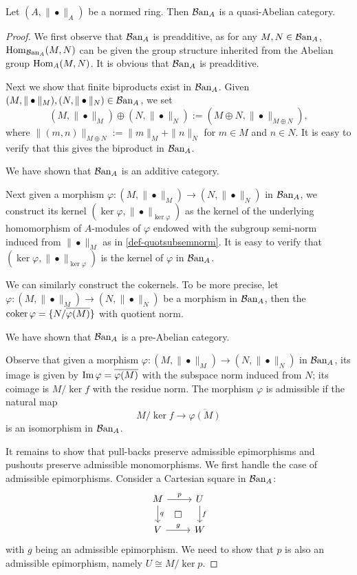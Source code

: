 \begin{thm}
    Let $(A,\|\bullet\|_A)$ be a normed ring. Then $\mathcal{B}\mathrm{an}_A$ is a quasi-Abelian category.
\end{thm}
\begin{proof}
    We first observe that $\mathcal{B}\mathrm{an}_A$ is preadditive, as for any $M,N\in \mathcal{B}\mathrm{an}_A$, $\operatorname{Hom}_{\mathcal{B}\mathrm{an}_A}(M,N)$ can be given the group structure inherited from the Abelian group $\operatorname{Hom}_A(M,N)$. It is obvious that $\mathcal{B}\mathrm{an}_A$ is preadditive.

    Next we show that finite biproducts exist in $\mathcal{B}\mathrm{an}_A$. Given $(M,\|\bullet\|_{M}),(N,\|\bullet\|_{N})\in \mathcal{B}\mathrm{an}_A$, we set 
    \begin{equation}\label{eq-normedmodulesum}
        (M,\|\bullet\|_{M})\oplus  (N,\|\bullet\|_{N}):=(M\oplus N,\|\bullet\|_{M\oplus N}),
    \end{equation}
    where $\|(m,n)\|_{M\oplus N}:=\|m\|_M+\|n\|_N$ for $m\in M$ and $n\in N$. It is easy to verify that this gives the biproduct in $\mathcal{B}\mathrm{an}_A$. 

    We have shown that $\mathcal{B}\mathrm{an}_A$ is an additive category.

    Next given a morphism $\varphi:(M,\|\bullet\|_M)\rightarrow (N,\|\bullet\|_N)$ in $\mathcal{B}\mathrm{an}_A$, we construct its kernel $(\ker \varphi, \|\bullet\|_{\ker\varphi})$ as the kernel of the underlying homomorphism of $A$-modules of $\varphi$ endowed with the subgroup semi-norm induced from $\|\bullet\|_M$ as in \cref{def-quotsubsemnorm}. It is easy to verify that $(\ker \varphi, \|\bullet\|_{\ker\varphi})$ is the kernel of $\varphi$ in  $\mathcal{B}\mathrm{an}_A$. 

    We can similarly construct the cokernels. To be more precise, let $\varphi:(M,\|\bullet\|_M)\rightarrow (N,\|\bullet\|_N)$ be a morphism in $\mathcal{B}\mathrm{an}_A$, then the $\operatorname{coker} \varphi=\{N/\overline{\varphi(M)}\}$ with quotient norm.

    We have shown that $\mathcal{B}\mathrm{an}_A$ is a pre-Abelian category. 
    
    Observe that given a morphism  $\varphi:(M,\|\bullet\|_M)\rightarrow (N,\|\bullet\|_N)$ in $\mathcal{B}\mathrm{an}_A$, its image is given by $\operatorname{Im} \varphi=\overline{\varphi(M)}$ with the subspace norm induced from $N$; its coimage is $M/\ker f$ with the residue norm. The morphism $\varphi$ is admissible if the natural map
    \[
        M/\ker f\rightarrow \overline{\varphi(M)}
    \]
    is an isomorphism in $\mathcal{B}\mathrm{an}_A$.

    It remains to show that pull-backs preserve admissible epimorphisms and pushouts preserve admissible monomorphisms. We first handle the case of admissible epimorphisms. Consider a Cartesian square in $\mathcal{B}\mathrm{an}_A$:
    \[
        \begin{tikzcd}
            M \arrow[r, "p"] \arrow[d, "q"] \arrow[rd, "\square", phantom] & U \arrow[d, "f"] \\
            V \arrow[r, "g"]                                               & W               
        \end{tikzcd}  
    \]
    with $g$ being an admissible epimorphism. We need to show that $p$ is also an admissible epimorphism, namely $U\cong M/\ker p$.


\end{proof}
